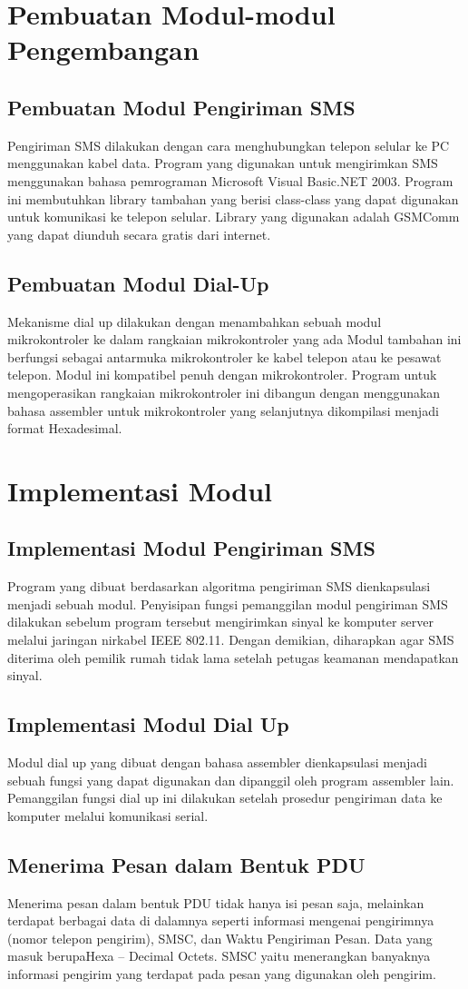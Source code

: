 \documentclass[12pt,a4paper]{article}
\begin{document}
\section{Pembuatan Modul-modul Pengembangan}
\subsection{Pembuatan Modul Pengiriman SMS}
Pengiriman SMS dilakukan dengan cara menghubungkan telepon selular ke PC menggunakan kabel data. 
Program yang digunakan untuk mengirimkan SMS menggunakan bahasa pemrograman Microsoft Visual Basic.NET 2003. Program ini membutuhkan library tambahan yang berisi class-class yang dapat digunakan untuk komunikasi ke telepon selular. Library yang digunakan adalah GSMComm yang dapat diunduh secara gratis dari internet. 
\subsection{Pembuatan Modul Dial-Up}
Mekanisme dial up dilakukan dengan menambahkan sebuah modul mikrokontroler ke dalam rangkaian mikrokontroler yang ada
Modul tambahan ini berfungsi sebagai antarmuka mikrokontroler ke kabel telepon atau ke pesawat telepon. Modul ini kompatibel penuh dengan mikrokontroler. 
Program untuk mengoperasikan rangkaian mikrokontroler ini dibangun dengan menggunakan bahasa assembler untuk mikrokontroler yang selanjutnya dikompilasi menjadi format Hexadesimal.


\section{Implementasi Modul}
\subsection{Implementasi Modul Pengiriman SMS}
Program yang dibuat berdasarkan algoritma pengiriman SMS dienkapsulasi menjadi sebuah modul. Penyisipan fungsi pemanggilan modul pengiriman SMS dilakukan sebelum program tersebut mengirimkan sinyal ke komputer server melalui jaringan nirkabel IEEE 802.11. Dengan demikian, diharapkan agar SMS diterima oleh pemilik rumah tidak lama setelah petugas keamanan mendapatkan sinyal. 
\subsection{Implementasi Modul Dial Up}
Modul dial up yang dibuat dengan bahasa assembler dienkapsulasi menjadi sebuah fungsi yang dapat digunakan dan dipanggil oleh program assembler lain. Pemanggilan fungsi dial up ini dilakukan setelah prosedur pengiriman data ke komputer melalui komunikasi serial.
\subsection{Menerima Pesan dalam Bentuk PDU}
Menerima pesan dalam bentuk PDU tidak hanya isi pesan saja, melainkan terdapat berbagai data di dalamnya seperti informasi mengenai pengirimnya (nomor telepon pengirim), SMSC, dan Waktu Pengiriman Pesan. Data yang masuk berupaHexa – Decimal Octets. SMSC yaitu menerangkan banyaknya informasi pengirim yang terdapat pada pesan yang digunakan oleh pengirim.
\end{document}

